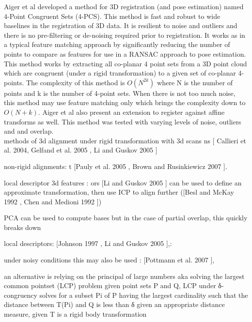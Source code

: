 Aiger et al \cite{Aiger084} developed a method for 3D registration (and pose estimation) named 4-Point Congruent Sets (4-PCS). This method is fast and robust to wide baselines in the registration of 3D data. It is resilient to noise and outliers and there is no pre-filtering or de-noising required prior to registration. It works as in a typical feature matching approach by significantly reducing the number of points to compare as features for use in a RANSAC approach to pose estimation. \\

This method works by extracting all co-planar 4 point sets from a 3D point cloud which are congruent (under a rigid transformation) to a given set of co-planar 4-points. The complexity of this method is $O(N^{2k})$ where N is the number of points and k is the number of 4-point sets. When there is not too much noise, this method may use feature matching only which brings the complexity down to $O(N+k)$. Aiger et al also present an extension to register against affine transforms as well. This method was tested with varying levels of noise, outliers and and overlap. \\



methods of 3d alignment under rigid transformation with 3d scans
ns [\cite{Callieri04Roboscan} Callieri et al. 2004, Gelfand et al. 2005 \cite{Gelfand04Shape}, Li and Guskov
2005 \cite{Li05Multiscale}]

non-rigid alignments:
t [Pauly et al. 2005 \cite{Pauly05Example}, Brown and
Rusinkiewicz 2007 \cite{Brown07Global}].


local descriptor 3d features : ors [Li and Guskov 2005 \cite{Li05Multiscale}] can be used to define an approximate transformation, then use ICP to align further ([Besl and McKay 1992 \cite{Besl92Method}, Chen and Medioni 1992 \cite{Chen92Object}])


PCA can be used to compute bases but in the case of partial overlap, this quickly breaks down

local descriptors: [Johnson 1997 \cite{Johnson97Spin}, Li
and Guskov 2005 \cite{Li05Multiscale}],: 

under noisy conditions this may also be used : [Pottmann et al. 2007 \cite{Pottmann07Principal}],

an alternative is relying on the principal of large numbers
aka solving the largest common pointset (LCP) problem 
given point sets P and Q, LCP under δ-congruency solves for a subset Pi of P
having the largest cardinality such that the distance between T(Pi) and Q  is less than δ given an appropriate distance measure, given T is a rigid body transformation

